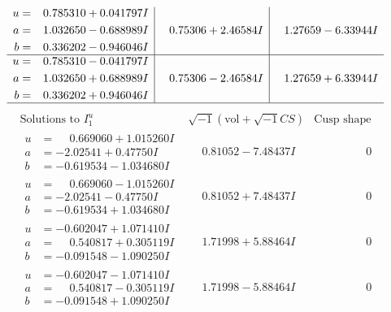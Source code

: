 \documentclass[1p]{elsarticle_modified}
\theoremstyle{definition}
\newcommand{\I}{\sqrt{-1}}
\begin{document}
$$\begin{array}{c|c|c}
\begin{aligned}
u &= \phantom{-}0.785310 + 0.041797 I \\
a &= \phantom{-}1.032650 - 0.688989 I \\
b &= \phantom{-}0.336202 - 0.946046 I\end{aligned}
 & \phantom{-}0.75306 + 2.46584 I & \phantom{-}1.27659 - 6.33944 I \\ \hline\begin{aligned}
u &= \phantom{-}0.785310 - 0.041797 I \\
a &= \phantom{-}1.032650 + 0.688989 I \\
b &= \phantom{-}0.336202 + 0.946046 I\end{aligned}
 & \phantom{-}0.75306 - 2.46584 I & \phantom{-}1.27659 + 6.33944 I\\
 \hline 
 \end{array}$$\newpage$$\begin{array}{c|c|c}  
\text{Solutions to }I^u_{1}& \I (\text{vol} + \sqrt{-1}CS) & \text{Cusp shape}\\
 \hline 
\begin{aligned}
u &= \phantom{-}0.669060 + 1.015260 I \\
a &= -2.02541 + 0.47750 I \\
b &= -0.619534 - 1.034680 I\end{aligned}
 & \phantom{-}0.81052 - 7.48437 I & \phantom{-0.000000 } 0 \\ \hline\begin{aligned}
u &= \phantom{-}0.669060 - 1.015260 I \\
a &= -2.02541 - 0.47750 I \\
b &= -0.619534 + 1.034680 I\end{aligned}
 & \phantom{-}0.81052 + 7.48437 I & \phantom{-0.000000 } 0 \\ \hline\begin{aligned}
u &= -0.602047 + 1.071410 I \\
a &= \phantom{-}0.540817 + 0.305119 I \\
b &= -0.091548 - 1.090250 I\end{aligned}
 & \phantom{-}1.71998 + 5.88464 I & \phantom{-0.000000 } 0 \\ \hline\begin{aligned}
u &= -0.602047 - 1.071410 I \\
a &= \phantom{-}0.540817 - 0.305119 I \\
b &= -0.091548 + 1.090250 I\end{aligned}
 & \phantom{-}1.71998 - 5.88464 I & \phantom{-0.000000 } 0 \\ \hline\begin{aligned}

\end{aligned}
\end{array}$$
\end{document}
